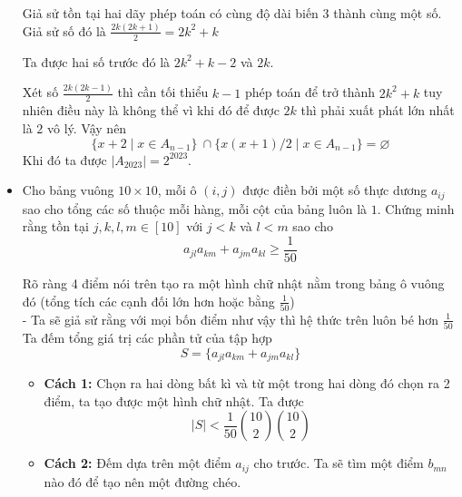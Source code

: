 \documentclass[11pt]{scrartcl}
\begin{document}
\begin{itemize}[label=, leftmargin=0em, itemsep=0.5em]
    \begin{sol}
        Giả sử tồn tại hai dãy phép toán có cùng độ dài biến $3$ thành cùng một số. Giả sử số đó là $\frac{2k(2k + 1)}{2} = 2k^2 + k$


        Ta được hai số trước đó là $2k^2 + k - 2$ và $2k$.


        Xét số $\frac{2k(2k - 1)}{2}$ thì cần tối thiểu $k - 1$ phép toán để trở thành $2k^2 + k$ tuy nhiên điều này là không thể vì khi đó để được $2k$ thì phải xuất phát lớn nhất là $2$ vô lý. Vậy nên 
        \[
            \{ x + 2 \mid x \in A_{n - 1} \} \ \cap \{x(x+1) / 2 \mid x \in A_{n - 1} \} = \varnothing
        \]
        Khi đó ta được $|A_{2023}| = 2^{2023}$.
    \end{sol}

    
    \item \begin{bt}
        Cho bảng vuông $10\times 10$, mỗi ô $(i,j)$ được điền bởi một số thực dương $a_{ij}$ sao cho tổng các số thuộc mỗi hàng, mỗi cột của bảng luôn là $1$. Chứng minh rằng tồn tại $j,k,l,m \in [10]$ với $j < k$ và $l < m$ sao cho
        \[
            a_{jl}a_{km} + a_{jm}a_{kl} \geq \frac{1}{50}
        \]
    \end{bt}
    \begin{sol}
        Rõ ràng 4 điểm nói trên tạo ra một hình chữ nhật nằm trong bảng ô vuông đó (tổng tích các cạnh đối lớn hơn hoặc bằng $\frac{1}{50}$)\\
    - Ta sẽ giả sử rằng với mọi bốn điểm như vậy thì hệ thức trên luôn bé hơn $\frac{1}{50}$\\
    Ta đếm tổng giá trị các phần tử của tập hợp
    $$ S = \{a_{jl}a_{km} + a_{jm}a_{kl} \}$$
    \begin{itemize}[label=,leftmargin=0em]
        \item \textbf{Cách 1:} Chọn ra hai dòng bất kì và từ một trong hai dòng đó chọn ra 2 điểm, ta tạo được một hình chữ nhật. Ta được $$|S| < \frac{1}{50}\binom{10}{2}\binom{10}{2} $$
                    \begin{figure}[ht]
            \centering
        \end{figure}
        \item \textbf{Cách 2:} Đếm dựa trên một điểm $a_{ij}$ cho trước. Ta sẽ tìm một điểm $b_{mn} $ nào đó để tạo nên một đường chéo. 
        

\end{itemize}
\end{sol}
\end{itemize}
\end{document}
